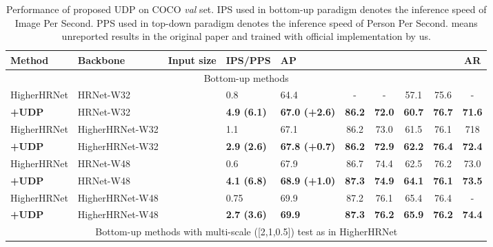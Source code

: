 \documentclass[10pt,journal,compsoc]{IEEEtran}
\begin{document}
\begin{table*}
\caption{Performance of proposed UDP on COCO \textit{val} set. IPS used in bottom-up paradigm denotes the inference speed of Image Per Second. PPS used in top-down paradigm denotes the inference speed of Person Per Second.  means unreported results in the original paper and trained with official implementation by us.}
\label{tab:val}
\begin{center}
\begin{tabular}{l|l|c|l|lccccc}

\hline
Method                   & Backbone         &Input size    &IPS/PPS                     &AP                     &  &  &  & &AR  \\
\hline
\multicolumn{10}{c}{Bottom-up methods}\\
\hline
HigherHRNet \cite{Higher}& HRNet-W32     &    &0.8                        &64.4                   & -             & -             & 57.1          &75.6           &-             \\
\textbf{+UDP}            & HRNet-W32     &    &\textbf{4.9 (6.1)} &\textbf{67.0 (+2.6)}   & \textbf{86.2} & \textbf{72.0} & \textbf{60.7} &\textbf{76.7}  &\textbf{71.6}          \\
HigherHRNet \cite{Higher}& HigherHRNet-W32&   &1.1                        &67.1                   & 86.2          & 73.0          & 61.5          &76.1           & 718            \\
\textbf{+UDP}            & HigherHRNet-W32&   &\textbf{2.9 (2.6)} &\textbf{67.8 (+0.7)}   & \textbf{86.2} & \textbf{72.9} & \textbf{62.2} &\textbf{76.4}  &\textbf{72.4}  \\
HigherHRNet \cite{Higher}&HRNet-W48& &0.6                        &67.9                  & 86.7              & 74.4         & 62.5          &76.2           &73.0\\
\textbf{+UDP}            &HRNet-W48      &    &\textbf{4.1 (6.8)} &\textbf{68.9 (+1.0)}         & \textbf{87.3}     & \textbf{74.9}& \textbf{64.1} &\textbf{76.1}  &\textbf{73.5}\\
HigherHRNet \cite{Higher}& HigherHRNet-W48&   &0.75                       &69.9                   & 87.2          & 76.1          & 65.4          &76.4           & -     \\
\textbf{+UDP}            & HigherHRNet-W48&   &\textbf{2.7 (3.6)} &\textbf{69.9}          & \textbf{87.3} & \textbf{76.2} & \textbf{65.9} &\textbf{76.2}  &\textbf{74.4} \\
\hline
\multicolumn{10}{c}{Bottom-up methods with multi-scale ([2,1,0.5]) test as in HigherHRNet \cite{Higher}}\\

\end{tabular}
\end{center}
\end{table*}
\end{document}
